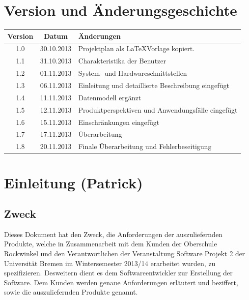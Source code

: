 \documentclass[fontsize=12pt,paper=a4,twoside]{scrartcl}
\begin{document}
\listoftables

\clearpage


\section*{Version und Änderungsgeschichte}

\begin{tabular}
	{ccl} Version & Datum & Änderungen \\
	\hline 1.0 & 30.10.2013 & Projektplan als \LaTeX Vorlage kopiert.\\
	1.1 & 31.10.2013 & Charakteristika der Benutzer\\
	1.2 & 01.11.2013 & System- und Hardwareschnittstellen \\
	1.3 & 06.11.2013 & Einleitung und detaillierte Beschreibung eingefügt\\
	1.4 & 11.11.2013 & Datenmodell ergänzt\\
	1.5 & 12.11.2013 & Produktperspektiven und Anwendungsfälle eingefügt\\
	1.6 & 15.11.2013 & Einschränkungen eingefügt\\
	1.7 & 17.11.2013 & Überarbeitung\\
	1.8 & 20.11.2013 & Finale Überarbeitung und Fehlerbeseitigung
\end{tabular}

%
%
\section{Einleitung (Patrick)} \label{sec:Einleitung} 
\subsection{Zweck} \label{subsec:Zweck} Dieses Dokument hat den Zweck, die Anforderungen der auszuliefernden Produkte, welche in Zusammenarbeit mit dem Kunden der Oberschule Rockwinkel und den Verantwortlichen der Veranstaltung Software Projekt 2 der Universität Bremen im Wintersemester 2013/14 erarbeitet wurden, zu spezifizieren. Desweitern dient es dem Softwareentwickler zur Erstellung der Software. Dem Kunden werden genaue Anforderungen erläutert und beziffert, sowie die auszuliefernden Produkte genannt.
\end{document}
